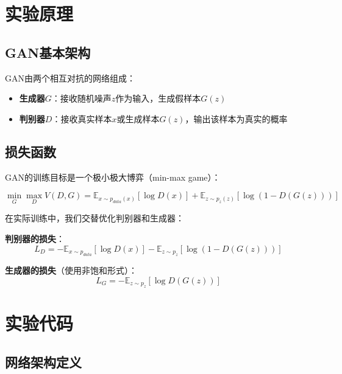 \documentclass[a4paper]{article}
\begin{document}
\section{实验原理}

\subsection{GAN基本架构}

GAN由两个相互对抗的网络组成：

\begin{itemize}
    \item \textbf{生成器$G$}：接收随机噪声$z$作为输入，生成假样本$G(z)$
    \item \textbf{判别器$D$}：接收真实样本$x$或生成样本$G(z)$，输出该样本为真实的概率
\end{itemize}

\subsection{损失函数}

GAN的训练目标是一个极小极大博弈（min-max game）：

\begin{equation}
    \min_G \max_D V(D, G) = \mathbb{E}_{x \sim p_{data}(x)}[\log D(x)] + \mathbb{E}_{z \sim p_z(z)}[\log(1 - D(G(z)))]
\end{equation}

在实际训练中，我们交替优化判别器和生成器：

\textbf{判别器的损失}：
\begin{equation}
    L_D = -\mathbb{E}_{x \sim p_{data}}[\log D(x)] - \mathbb{E}_{z \sim p_z}[\log(1 - D(G(z)))]
\end{equation}

\textbf{生成器的损失}（使用非饱和形式）：
\begin{equation}
    L_G = -\mathbb{E}_{z \sim p_z}[\log D(G(z))]
\end{equation}

\section{实验代码}

\subsection{网络架构定义}
\end{document}
